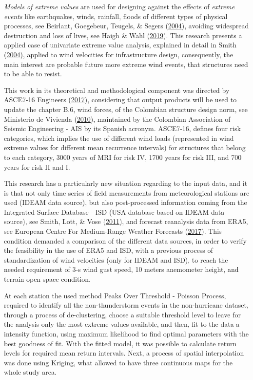 \documentclass[12pt,oneside]{reedthesis}
\begin{document}
  \begin{preface}
    \emph{Models of extreme values} are used for designing against the effects of \emph{extreme events} like earthquakes, winds, rainfall, floods of different types of physical processes, see Beirlant, Goegebeur, Teugels, \& Segers (\protect\hyperlink{ref-Beirlant2004}{2004}), avoiding widespread destruction and loss of lives, see Haigh \& Wahl (\protect\hyperlink{ref-Haigh2019}{2019}). This research presents a applied case of univariate extreme value analysis, explained in detail in Smith (\protect\hyperlink{ref-Smith2004}{2004}), applied to wind velocities for infrastructure design, consequently, the main interest are probable future more extreme wind events, that structures need to be able to resist.
    
    This work in its theoretical and methodological component was directed by ASCE7-16 Engineers (\protect\hyperlink{ref-Asce2017}{2017}), considering that output products will be used to update the chapter B.6, wind forces, of the Colombian structure design norm, see Ministerio de Vivienda (\protect\hyperlink{ref-nsr10}{2010}), maintained by the Colombian Association of Seismic Engineering - AIS by its Spanish acronym. ASCE7-16, defines four risk categories, which implies the use of different wind loads (represented in wind extreme values for different mean recurrence intervals) for structures that belong to each category, 3000 years of MRI for risk IV, 1700 years for risk III, and 700 years for risk II and I.
    
    This research has a particularly new situation regarding to the input data, and it is that not only time series of field measurements from meteorological stations are used (IDEAM data source), but also post-processed information coming from the Integrated Surface Database - ISD (USA database based on IDEAM data source), see Smith, Lott, \& Vose (\protect\hyperlink{ref-Smith2011}{2011}), and forecast reanalysis data from ERA5, see European Centre For Medium-Range Weather Forecasts (\protect\hyperlink{ref-ECFMRWF2017}{2017}). This condition demanded a comparison of the different data sources, in order to verify the feasibility in the use of ERA5 and ISD, with a previous process of standardization of wind velocities (only for IDEAM and ISD), to reach the needed requirement of 3-s wind gust speed, 10 meters anemometer height, and terrain open space condition.
    
    At each station the used method Peaks Over Threshold - Poisson Process, required to identify all the non-thunderstorm events in the non-hurricane dataset, through a process of de-clustering, choose a suitable threshold level to leave for the analysis only the most extreme values available, and then, fit to the data a intensity function, using maximum likelihood to find optimal parameters with the best goodness of fit. With the fitted model, it was possible to calculate return levels for required mean return intervals. Next, a process of spatial interpolation was done using Kriging, what allowed to have three continuous maps for the whole study area.
  \end{preface}
  \hypersetup{linkcolor=black}
  \setcounter{tocdepth}{4}
  \tableofcontents
\end{document}
